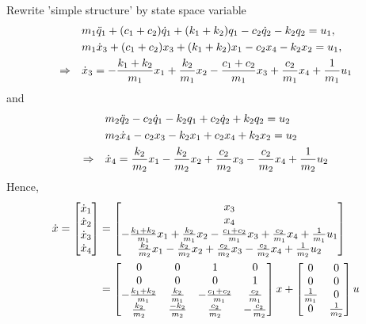 \documentclass[12pt,a4paper]{article}
\begin{document}
Rewrite  'simple structure' by state space variable
\[
\begin{aligned}
	&m_1\ddot q_1+(c_1+c_2)\dot q_1+(k_1+k_2)q_1-c_2\dot q_2-k_2q_2 = u_1,\\
	&m_1 \dot x_3 + (c_1 + c_2) x_3 + (k_1 + k_2) x_1  - c_2 x_4 - k_2x_2 = u_1, \\
	\Rightarrow \quad &\dot x_3 = -{k_1 + k_2 \over m_1} x_1 + {k_2\over m_1} x_2 - {c_1 + c_2\over m_1} x_3 + {c_2\over m_1} x_4 + {1\over m_1} u_1
\end{aligned}
\]
and
\[
\begin{aligned}
	&m_2\ddot q_2-c_2\dot q_1-k_2q_1+c_2\dot q_2+k_2q_2 = u_2 \\
	&m_2 \dot x_4 - c_2 x_3 - k_2 x_1 + c_2 x_4 + k_2 x_2 = u_2 \\
	\Rightarrow \quad & \dot x_4 = {k_2\over m_2} x_1 - {k_2 \over m_2} x_2 + {c_2\over m_2} x_3 - {c_2\over m_2} x_4 + {1\over m_2} u_2
\end{aligned}
\]
Hence, 
\begin{align*}
\dot x = \begin{bmatrix}
	\dot x_1 \\ \dot x_2 \\ \dot x_3 \\ \dot x_4
\end{bmatrix} &= \begin{bmatrix}
x_3 \\ x_4 \\
 -{k_1 + k_2 \over m_1} x_1 + {k_2\over m_1} x_2 - {c_1 + c_2\over m_1} x_3 + {c_2\over m_1} x_4 + {1\over m_1} u_1 \\
  {k_2\over m_2} x_1 - {k_2 \over m_2} x_2 + {c_2\over m_2} x_3 - {c_2\over m_2} x_4 + {1\over m_2} u_2
\end{bmatrix} 
\\&= \begin{bmatrix}
 0 & 0 & 1 & 0 \\
 0 & 0 & 0 & 1 \\
 -{k_1 + k_2 \over m_1} & {k_2\over m_1} & - {c_1 + c_2\over m_1} & {c_2\over m_1} \\
{k_2\over m_2} & {-k_2\over m_2} & {c_2\over m_2} & -{c_2\over m_2}
\end{bmatrix} x + \begin{bmatrix}
0 & 0 \\
0 & 0 \\
{1\over m_1} & 0 \\
0 & {1\over m_2}
\end{bmatrix}u
\end{align*}
\end{document}
